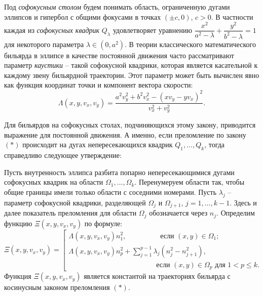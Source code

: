 Под \textit{софокусным столом} будем понимать область, ограниченную дугами эллипсов и гипербол с общими фокусами в точках $(\pm c, 0)$, $c > 0$. В частности каждая из \textit{софокусных квадрик} $Q_\lambda$ удовлетворяет уравнению $\dfrac{x^2}{a^2-\lambda} +\dfrac{y^2}{b^2-\lambda} = 1$ для некоторого параметра  $\lambda \in (0, a^2)$.
В теории классического математического бильярда в эллипсе в качестве постоянной движения часто рассматривают параметр \textit{каустики} -- такой софокусной квадрики, которая является касательной к каждому звену бильярдной траектории. Этот параметр может быть вычислен явно как функция координат точки и компонент вектора скорости:
$$\Lambda(x, y, v_x, v_y) =  \dfrac{a^2 v_y^2 + b^2v_x^2 - (x v_y-y v_x)^2}{v_x^2 + v_y^2}.$$

Для бильярдов на софокусных столах, подчиняющихся этому закону, приводится выражение для постоянной движения.
А именно, если преломление по закону $(\ast)$ происходит на дугах непересекающихся квадрик $Q_1, \ldots, Q_k$, тогда справедливо следующее утверждение:

\renewcommand{\thetheorem}{9}
\begin{theorem}
Пусть внутренность эллипса разбита попарно непересекающимися дугами софокусных квадрик на области $\Omega_1, \ldots, \Omega_k$. Перенумеруем области так, чтобы общие границы имели только области с соседними номерами. Пусть $\lambda_j$ -- параметр софокусной квадрики, разделяющей $\Omega_j$ и $\Omega_{j+1}$, $j=1, \ldots, k-1$. Здесь и далее показатель преломления для области $\Omega_j$ обозначается через $n_j$.
Определим функцию $\Xi(x, y, v_x, v_y)$ по формуле: 
\begin{equation*}
\Xi(x, y, v_x, v_y) = \left[
\begin{array}{ll}
    \Lambda(x, y, v_x, v_y) n_1^2, \qquad  \ \ \qquad   \text{ если } (x,y) \in \Omega_1 ;
    \\
    \Lambda(x, y, v_x, v_y) n_p^2 + \sum_{j=1}^{p-1} \lambda_j(n_j^2-n_{j+1}^2), \\
     \qquad \qquad \qquad \qquad \qquad \qquad  \text{ если } (x,y) \in \Omega_p \text{ для } 1 < p \leq k. 
\end{array}
\right.
\end{equation*}
Функция $\Xi(x, y, v_x, v_y)$ является константой на траекториях бильярда с косинусным законом преломления $(\ast)$.
\label{th:intro_non_intersecting}
\end{theorem}

